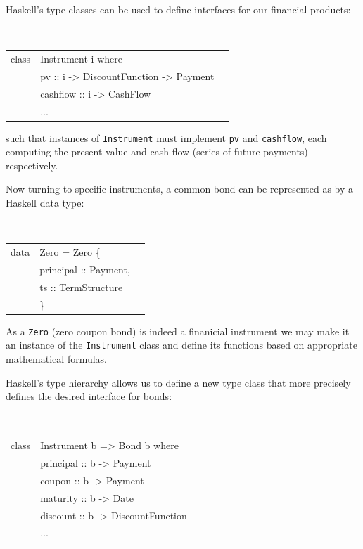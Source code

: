 \documentclass[11pt]{article}
\begin{document}
Haskell's type classes can be used to define interfaces for our financial products:

\begin{center}
\tt
\begin{tabular}{lll}
class & Instrument i where\\
      &\hspace{-1cm} pv       :: i -> DiscountFunction -> Payment\\
      &\hspace{-1cm} cashflow :: i -> CashFlow\\
      &\hspace{-1cm} ...\\
\end{tabular}
\end{center}

such that instances of {\tt Instrument} must implement {\tt pv} and {\tt cashflow}, each
computing the present value and cash flow (series of future payments) respectively.

Now turning to specific instruments, a common bond can be represented as by a
Haskell data type:

\begin{center}
\tt
\begin{tabular}{lll}
data & Zero = Zero \{\\
      &\hspace{-1cm} principal :: Payment,\\
      &\hspace{-1cm} ts :: TermStructure\\
      &\hspace{-1cm}\}
\end{tabular}
\end{center}

As a {\tt Zero} (zero coupon bond) is indeed a finanicial instrument we may make it an instance of
the {\tt Instrument} class and define its functions based on appropriate mathematical
formulas.

Haskell's type hierarchy allows us to define a new type class that more precisely
defines the desired interface for bonds:

\begin{center}
\tt
\begin{tabular}{lll}
class & Instrument b => Bond b where\\
      &\hspace{-1cm} principal :: b -> Payment\\
      &\hspace{-1cm} coupon    :: b -> Payment\\
      &\hspace{-1cm} maturity  :: b -> Date\\
      &\hspace{-1cm} discount  :: b -> DiscountFunction\\
      &\hspace{-1cm} ...\\
\end{tabular}
\end{center}
\end{document}
